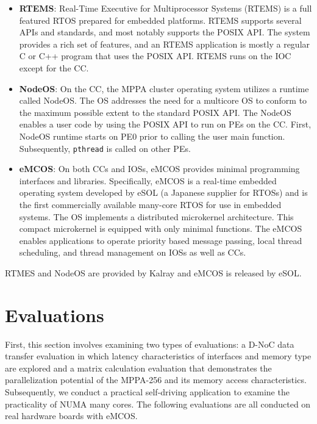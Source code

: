   \begin{itemize}
    \setlength{\leftskip}{-5mm}    
    \item \textbf{RTEMS}: Real-Time Executive for Multiprocessor Systems (RTEMS) is a full featured RTOS prepared for embedded platforms.
    RTEMS supports several APIs and standards, and most notably supports the POSIX API.
    The system provides a rich set of features, and an RTEMS application is mostly a regular C or C++ program that uses the POSIX API.
    RTEMS runs on the IOC except for the CC.
    
    \item \textbf{NodeOS}: On the CC, the MPPA cluster operating system utilizes a runtime called NodeOS.
    The OS addresses the need for a multicore OS to conform to the maximum possible extent to the standard POSIX API.
    The NodeOS enables a user code by using the POSIX API to run on PEs on the CC.
    First, NodeOS runtime starts on PE0 prior to calling the user main function.
    Subsequently, \texttt{pthread} is called on other PEs.
    
    \item \textbf{eMCOS}: On both CCs and IOSs, eMCOS provides minimal programming interfaces and libraries.
    Specifically, eMCOS is a real-time embedded operating system developed by eSOL (a Japanese supplier for RTOSs) and is the first commercially available many-core RTOS for use in embedded systems.
    The OS implements a distributed microkernel architecture.
    This compact microkernel is equipped with only minimal functions.
    The eMCOS enables applications to operate priority based message passing, local thread scheduling, and thread management on IOSs as well as CCs.
  \end{itemize}

  RTMES and NodeOS are provided by Kalray and eMCOS is released by eSOL.
  
  \chapter{Evaluations}
  \label{sec:evaluations}
  First, this section involves examining two types of evaluations: a D-NoC data transfer evaluation in which latency characteristics of interfaces and memory type are explored and a matrix calculation evaluation that demonstrates the parallelization potential of the MPPA-256 and its memory access characteristics.
  Subsequently, we conduct a practical self-driving application to examine the practicality of NUMA many cores.
  The following evaluations are all conducted on real hardware boards with eMCOS.
  
